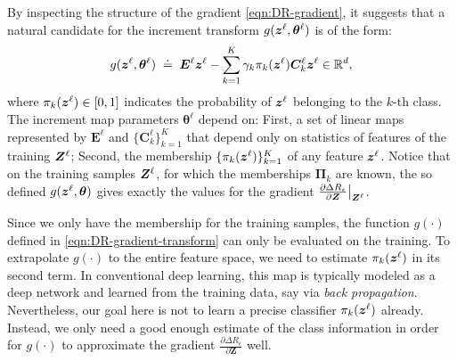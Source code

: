 \documentclass[../../book-main.tex]{subfiles}
\begin{document}
By inspecting the structure of the gradient \eqref{eqn:DR-gradient}, it suggests that a natural candidate for the increment transform $g(\bm{z}^\ell, \bm \theta^\ell)$ is of the form:
\begin{equation}
    g(\bm{z}^\ell, \bm \theta^\ell) \; \doteq \; \bm E^\ell \bm{z}^\ell - \sum_{k=1}^K \gamma_{k} \pi_k(\bm{z}^\ell)\bm C_{k}^{\ell}  \bm{z}^{\ell}  \in \mathbb{R}^d,
    \label{eqn:DR-gradient-transform}
\end{equation}
where $\pi_k(\bm{z}^\ell) \in [0,1]$ indicates the probability of $\bm{z}^{\ell}$ belonging to the $k$-th class. The increment map parameters $\bm \theta^\ell$ depend on: First, a set of linear maps represented by $\bm E^{\ell}$ and $\{ \bm C^{\ell}_{k}\}_{k=1}^{K}$ that depend only on statistics of features of the training $\bm{Z}^\ell$; Second, the membership $\{ \pi_k(\bm{z}^\ell)\}_{k=1}^K$ of any feature $\bm{z}^\ell$. 
Notice that on the training samples $\bm{Z}^\ell$, for which the memberships $\bm \Pi_k$ are known,  the so defined $g(\bm{z}^\ell, \bm \theta)$ gives exactly the values for the gradient $\frac{\partial \Delta R_{\epsilon}}{\partial \bm Z}\big|_{\bm{Z}^\ell}$.  


Since we only have the membership  for the training samples, the function $g(\cdot)$ defined in \eqref{eqn:DR-gradient-transform} can only be evaluated on the training. To extrapolate $g(\cdot)$ to the entire feature space, we need to estimate $\pi_k(\bm{z}^\ell)$ in its second term. In conventional deep learning, this map is typically modeled as a deep network and learned from the training data, say via {\em back propagation}. Nevertheless, our goal here is not to learn a precise classifier $\pi_{k}(\bm{z}^\ell)$ already. Instead, we only need a good enough estimate of the class information in order for $g(\cdot)$ to approximate the gradient $\frac{\partial \Delta R_{\epsilon}}{\partial \bm Z}$ well. 
\end{document}
